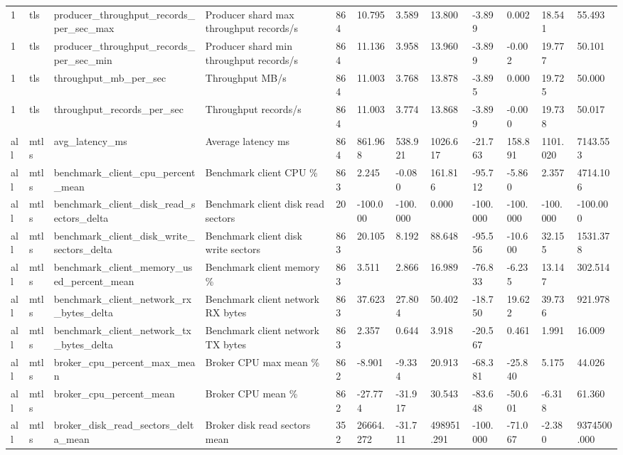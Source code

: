 \begin{longtable}{llllllllllll}
1 & tls & producer\_throughput\_records\_per\_sec\_max & Producer shard max throughput records/s & 864 & 10.795 & 3.589 & 13.800 & -3.899 & 0.002 & 18.541 & 55.493 \\
1 & tls & producer\_throughput\_records\_per\_sec\_min & Producer shard min throughput records/s & 864 & 11.136 & 3.958 & 13.960 & -3.899 & -0.002 & 19.777 & 50.101 \\
1 & tls & throughput\_mb\_per\_sec & Throughput MB/s & 864 & 11.003 & 3.768 & 13.878 & -3.895 & 0.000 & 19.725 & 50.000 \\
1 & tls & throughput\_records\_per\_sec & Throughput records/s & 864 & 11.003 & 3.774 & 13.868 & -3.899 & -0.000 & 19.738 & 50.017 \\
all & mtls & avg\_latency\_ms & Average latency ms & 864 & 861.968 & 538.921 & 1026.617 & -21.763 & 158.891 & 1101.020 & 7143.553 \\
all & mtls & benchmark\_client\_cpu\_percent\_mean & Benchmark client CPU \% & 863 & 2.245 & -0.080 & 161.816 & -95.712 & -5.860 & 2.357 & 4714.106 \\
all & mtls & benchmark\_client\_disk\_read\_sectors\_delta & Benchmark client disk read sectors & 20 & -100.000 & -100.000 & 0.000 & -100.000 & -100.000 & -100.000 & -100.000 \\
all & mtls & benchmark\_client\_disk\_write\_sectors\_delta & Benchmark client disk write sectors & 863 & 20.105 & 8.192 & 88.648 & -95.556 & -10.600 & 32.155 & 1531.378 \\
all & mtls & benchmark\_client\_memory\_used\_percent\_mean & Benchmark client memory \% & 863 & 3.511 & 2.866 & 16.989 & -76.833 & -6.235 & 13.147 & 302.514 \\
all & mtls & benchmark\_client\_network\_rx\_bytes\_delta & Benchmark client network RX bytes & 863 & 37.623 & 27.804 & 50.402 & -18.750 & 19.622 & 39.736 & 921.978 \\
all & mtls & benchmark\_client\_network\_tx\_bytes\_delta & Benchmark client network TX bytes & 863 & 2.357 & 0.644 & 3.918 & -20.567 & 0.461 & 1.991 & 16.009 \\
all & mtls & broker\_cpu\_percent\_max\_mean & Broker CPU max mean \% & 862 & -8.901 & -9.334 & 20.913 & -68.381 & -25.840 & 5.175 & 44.026 \\
all & mtls & broker\_cpu\_percent\_mean & Broker CPU mean \% & 862 & -27.774 & -31.917 & 30.543 & -83.648 & -50.601 & -6.318 & 61.360 \\
all & mtls & broker\_disk\_read\_sectors\_delta\_mean & Broker disk read sectors mean & 352 & 26664.272 & -31.711 & 498951.291 & -100.000 & -71.067 & -2.380 & 9374500.000 \\

\end{longtable}
